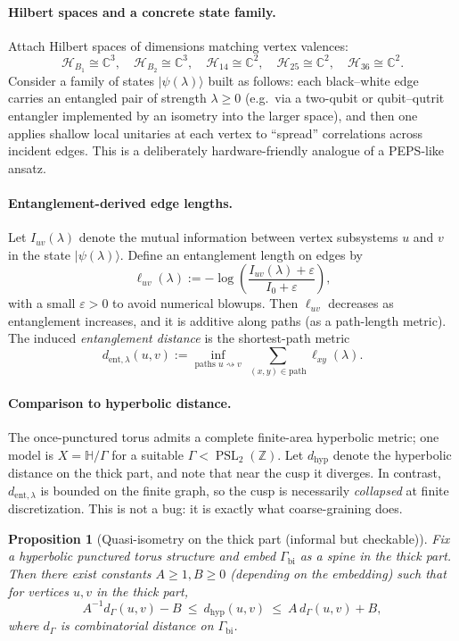 \documentclass[11pt,oneside]{amsbook}
\numberwithin{equation}{section}
\theoremstyle{plain}
\newtheorem{proposition}[theorem]{Proposition}
\theoremstyle{definition}
\theoremstyle{remark}
\newcommand{\HH}{\mathbb{H}}
\newcommand{\Z}{\mathbb{Z}}
\newcommand{\C}{\mathbb{C}}
\DeclareMathOperator{\PSL}{\mathrm{PSL}}
\newcommand{\cH}{\mathcal{H}}
\begin{document}
\paragraph{Hilbert spaces and a concrete state family.}
Attach Hilbert spaces of dimensions matching vertex valences:
\[
\cH_{B_1}\cong \C^3,\quad \cH_{B_2}\cong \C^3,\quad 
\cH_{14}\cong \C^2,\quad \cH_{25}\cong \C^2,\quad \cH_{36}\cong \C^2.
\]
Consider a family of states $|\psi(\lambda)\rangle$ built as follows:
each black--white edge carries an entangled pair of strength $\lambda\ge 0$ (e.g.\ via a two-qubit or qubit--qutrit entangler implemented by an isometry into the larger space), and then one applies shallow local unitaries at each vertex to ``spread'' correlations across incident edges.
This is a deliberately hardware-friendly analogue of a PEPS-like ansatz.

\paragraph{Entanglement-derived edge lengths.}
Let $I_{uv}(\lambda)$ denote the mutual information between vertex subsystems $u$ and $v$ in the state $|\psi(\lambda)\rangle$.
Define an entanglement length on edges by
\[
\ell_{uv}(\lambda):= -\log\!\left(\frac{I_{uv}(\lambda)+\varepsilon}{I_0+\varepsilon}\right),
\]
with a small $\varepsilon>0$ to avoid numerical blowups.
Then $\ell_{uv}$ decreases as entanglement increases, and it is additive along paths (as a path-length metric).
The induced \emph{entanglement distance} is the shortest-path metric
\[
d_{\mathrm{ent},\lambda}(u,v):=\inf_{\text{paths }u\rightsquigarrow v}\ \sum_{(x,y)\in \text{path}}\ell_{xy}(\lambda).
\]

\paragraph{Comparison to hyperbolic distance.}
The once-punctured torus admits a complete finite-area hyperbolic metric; one model is $X=\HH/\Gamma$ for a suitable $\Gamma<\PSL_2(\Z)$.
Let $d_{\mathrm{hyp}}$ denote the hyperbolic distance on the thick part, and note that near the cusp it diverges.
In contrast, $d_{\mathrm{ent},\lambda}$ is bounded on the finite graph, so the cusp is necessarily \emph{collapsed} at finite discretization.
This is not a bug: it is exactly what coarse-graining does.

\begin{proposition}[Quasi-isometry on the thick part (informal but checkable)]
Fix a hyperbolic punctured torus structure and embed $\Gamma_{\mathrm{bi}}$ as a spine in the thick part.
Then there exist constants $A\ge 1,B\ge 0$ (depending on the embedding) such that for vertices $u,v$ in the thick part,
\[
A^{-1}d_{\Gamma}(u,v)-B\ \le\ d_{\mathrm{hyp}}(u,v)\ \le\ A\,d_{\Gamma}(u,v)+B,
\]
where $d_\Gamma$ is combinatorial distance on $\Gamma_{\mathrm{bi}}$.
\end{proposition}
\end{document}
